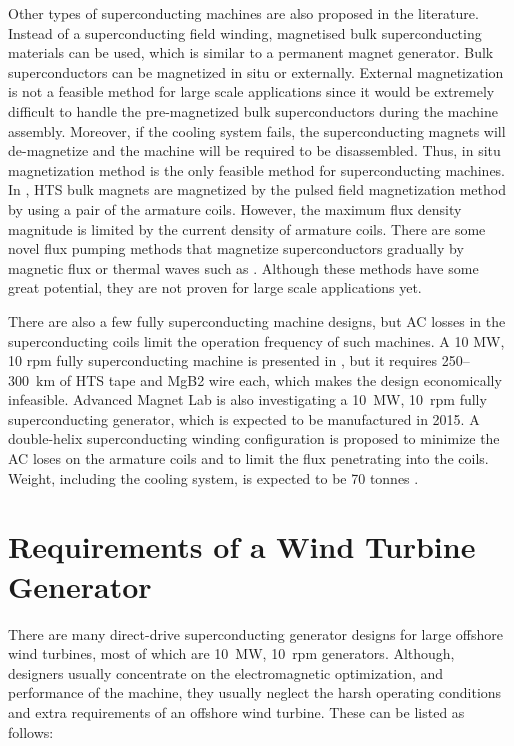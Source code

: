\documentclass[12pt]{IET02}
\begin{document}
Other types of superconducting machines are also proposed in the literature. Instead of a superconducting field winding, magnetised bulk superconducting materials can be used, which is similar to a permanent magnet generator. Bulk superconductors can be magnetized in situ or externally. External magnetization is not a feasible method for large scale applications since it would be extremely difficult to handle the pre-magnetized bulk superconductors during the machine assembly. Moreover, if the cooling system fails,  the superconducting magnets will de-magnetize and the machine will be required to be disassembled.  
Thus, in situ magnetization method is the only feasible method for superconducting machines. 
In \cite{Matsuzaki2007}, HTS bulk magnets are magnetized by the pulsed field magnetization method by using a pair of the armature coils. However, the maximum flux density magnitude is limited by the current density of armature coils. There are some novel flux pumping methods that magnetize superconductors gradually by magnetic flux or thermal waves such as \cite{Masson2007b,Coombs2009}. Although these methods have some great potential, they are not proven for large scale applications yet.

There are also a few fully superconducting machine designs, but AC losses in the superconducting coils limit the operation frequency of such machines. A 10 MW, 10 rpm fully superconducting machine is presented in \cite{Terao2012}, but it requires 250--300~km of HTS tape and MgB2 wire each, which makes the design economically infeasible. Advanced Magnet Lab is also investigating a 10~MW, 10~rpm fully superconducting generator, which is expected to be manufactured in 2015. A double-helix superconducting winding configuration is proposed to minimize the AC loses on the armature coils and to limit the flux penetrating into the coils. Weight, including the cooling system, is expected to be 70 tonnes \cite{Masson2011}.

\section{Requirements of a Wind Turbine Generator}

There are many direct-drive superconducting generator designs for large offshore wind turbines, most of which are 10~MW, 10~rpm generators. Although, designers usually concentrate on the electromagnetic optimization, and performance of the machine, they usually neglect the harsh operating conditions and extra requirements of an offshore wind turbine. These can be listed as follows:
\end{document}
